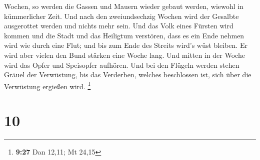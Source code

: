 Wochen, so werden die Gassen und Mauern wieder gebaut werden, wiewohl in
kümmerlicher Zeit.  Und nach den zweiundsechzig Wochen
wird der Gesalbte ausgerottet werden und nichts mehr sein. Und das Volk
eines Fürsten wird kommen und die Stadt und das Heiligtum verstören,
dass es ein Ende nehmen wird wie durch eine Flut; und bis zum Ende des
Streits wird's wüst bleiben.  Er wird aber vielen den
Bund stärken eine Woche lang. Und mitten in der Woche wird das Opfer und
Speisopfer aufhören. Und bei den Flügeln werden stehen Gräuel der
Verwüstung, bis das Verderben, welches beschlossen ist, sich über die
Verwüstung ergießen wird. \footnote{\textbf{9:27} Dan 12,11; Mt 24,15}

\hypertarget{section-9}{%
\section{10}\label{section-9}}

